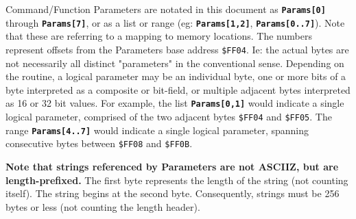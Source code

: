 \documentclass[12pt]{article}
\newcommand{\MonoSp}[1] {\fontsize{10pt}{10pt}\selectfont\texttt{#1}\normalsize}
\newcommand{\Param}[1] {\textbf{\texttt{Params[#1]}}}
\begin{document}
Command/Function Parameters are notated in this document as \Param{0} through \Param{7},
or as a list or range (eg: \Param{1,2}, \Param{0..7}).
Note that these are referring to a mapping to memory locations.
The numbers represent offsets from the Parameters base address \MonoSp{\$FF04}.
Ie: the actual bytes are not necessarily all distinct "parameters" in the conventional sense.
Depending on the routine, a logical parameter may be an individual byte,
one or more bits of a byte interpreted as a composite or bit-field,
or multiple adjacent bytes interpreted as 16 or 32 bit values.
For example, the list \Param{0,1} would indicate a single logical parameter,
comprised of the two adjacent bytes \MonoSp{\$FF04} and \MonoSp{\$FF05}.
The range \Param{4..7} would indicate a single logical parameter,
spanning consecutive bytes between \MonoSp{\$FF08} and \MonoSp{\$FF0B}.
\newline

\textbf{Note that strings referenced by Parameters are not ASCIIZ, but are length-prefixed.}
The first byte represents the length of the string (not counting itself). The string begins at the second byte.
Consequently, strings must be 256 bytes or less (not counting the length header).
\newline


\pagebreak
\end{document}
